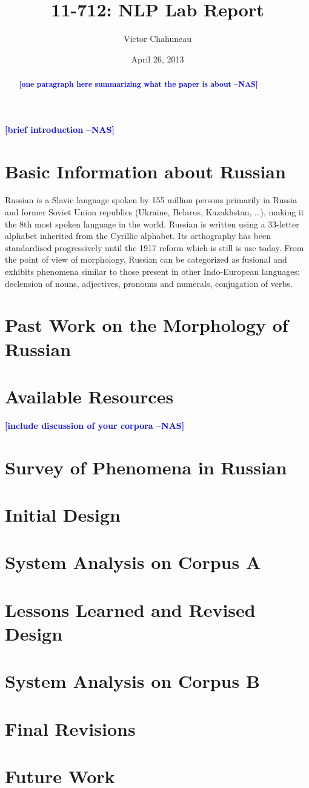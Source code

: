 \documentclass[11pt,letterpaper]{article}
\title{11-712:  NLP Lab Report}
\author{Victor Chahuneau}
\date{April 26, 2013}
\newcommand{\nascomment}[1]{\textcolor{blue}{\textbf{[#1 --NAS]}}}
\begin{document}
\maketitle
\begin{abstract}
\nascomment{one paragraph here summarizing what the paper is about}
\end{abstract}

\nascomment{brief introduction}

\section{Basic Information about Russian}
Russian is a Slavic language spoken by 155 million persons primarily in Russia and former Soviet Union republics (Ukraine, Belarus, Kazakhstan, \ldots), making it the 8th most spoken language in the world. Russian is written using a 33-letter alphabet inherited from the Cyrillic alphabet. Its orthography has been standardised progressively until the 1917 reform which is still is use today. From the point of view of morphology, Russian can be categorized as fusional and exhibits phenomena similar to those present in other Indo-European languages: declension of nouns, adjectives, pronouns and numerals, conjugation of verbs.

\section{Past Work on the Morphology of Russian}

\section{Available Resources}

\nascomment{include discussion of your corpora}

\section{Survey of Phenomena in Russian}

\section{Initial Design}

\section{System Analysis on Corpus A}

\section{Lessons Learned and Revised Design}

\section{System Analysis on Corpus B}

\section{Final Revisions}

\section{Future Work}




\label{lastpage}
\end{document}
